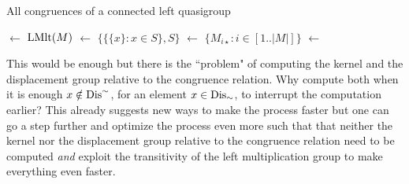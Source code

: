 \documentclass{mcom-l}
\begin{document}
\begin{algorithm}[H]
\label{congsSmart1}
\DontPrintSemicolon
\caption{All congruences of a connected left quasigroup}



\BlankLine
\BlankLine
\lmlt $\leftarrow$ $\operatorname{LMlt}(M)$\;
\congruences $\leftarrow$ $\{\{ \{ x\} : x \in S\}, S\}$\;
\Ls $\leftarrow$ $\{ M_{i\star} : i \in [1..|M|]\}$\;
\blocks $\leftarrow$ \partition{\lmlt}\;
\Return{\congruences}
\end{algorithm}


\noindent This would be enough but there is the ``problem" of computing the kernel and the displacement group relative to the congruence relation. Why compute both when it is enough $x\notin \operatorname{Dis}^\sim$, for an element $x\in \operatorname{Dis}_\sim$, to interrupt the computation earlier? This already suggests new ways to make the process faster but one can go a step further and optimize the process even more such that that neither the kernel nor the displacement group relative to the congruence relation need to be computed \emph{and} exploit the transitivity of the left multiplication group to make everything even faster.
\end{document}
